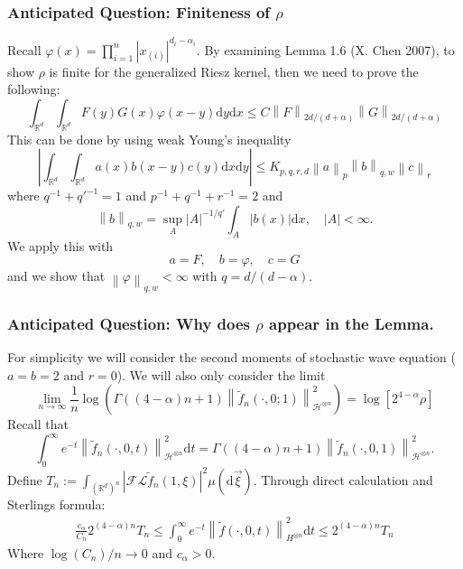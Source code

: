 \documentclass{beamer}%
\numberwithin{equation}{section}
\newcommand{\R}{\mathbb{R}}
\newcommand{\Norm}[1]{\left\|  #1   \right\|}
\newcommand{\ud}{\ensuremath{\mathrm{d} }}
\begin{document}
	\begin{frame}[t]
		\frametitle{Anticipated Question: Finiteness of $\rho$}
		Recall $\varphi(x) = \prod_{i=1}^n|x_{(i)}|^{d_i-\alpha_i}$. By examining Lemma 1.6 (X. Chen 2007), to show $\rho$ is finite for the generalized Riesz kernel, then we need to prove the following:
		\[\int_{\R^d}\int_{\R^d} F(y)G(x)\varphi(x-y) \ud y \ud x \le C \Norm{F}_{2d/(d+\alpha)} \Norm{G}_{2d/(d+ \alpha)}\]
		This can be done by using weak Young's inequality
		\[
		\left|	\int_{\R^d}\int_{\R^d}a(x)b(x-y)c(y) \ud x \ud y \right| \le K_{p,q,r,d} \Norm{a}_p\Norm{b}_{q,w}\Norm{c}_r
		\]
		where $q^{-1} + q'^{-1} = 1$ and $p^{-1}+q^{-1}+r^{-1} =2$ and
		\[
		\Norm{b}_{q,w} = \sup_{A} |A|^{-1/q'} \int_A |b(x)| \ud x, \quad |A| < \infty.
		\]
		We apply this with
		\[
		a=F, \quad b=\varphi, \quad c= G
		\]
		and we show that $\Norm{\varphi}_{q,w} < \infty$ with $q=d/(d-\alpha)$.
	\end{frame}
	
	
	\begin{frame}
		\frametitle{Anticipated Question: Why does $\rho$ appear in the Lemma.}
		
		For simplicity we will consider the second moments of stochastic wave equation ($a=b=2$ and $r=0$). We will also only consider the limit
		\[
		\lim_{n \to \infty}\frac{1}{n} \log\left(\Gamma((4-\alpha)n+1)\Norm{\tilde{f}_n(\cdot,0;1)}_{\mathcal{H}^{\otimes n}}^2\right) = \log\left[ 2^{4-\alpha}\rho \right]
		\]
		Recall that
		\[
		\int_0^\infty e^{-t}\Norm{\tilde{f}_n(\cdot,0,t)}_{\mathcal{H}^{\otimes n}}^2  \ud t = \Gamma((4-\alpha)n+1)\Norm{\tilde{f}_n(\cdot,0,1)}_{\mathcal{H}^{\otimes n}}^2.
		\]
		Define $T_n:= \int_{(\R^d)^n} \left| \mathcal{F}\mathcal{L}\tilde{f}_n(1,\xi)\right|^2 \mu (\ud \vec{\xi})$. Through direct calculation and Sterlings formula:
		\begin{align*}
		\frac{c_\alpha}{C_n} 2^{(4-\alpha)n}T_n \le \int_0^\infty e^{-t} \Norm{\tilde{f}(\cdot,0,t)}_{H^{\otimes n}}^2 \ud t  \le 2^{(4-\alpha)n}T_n
		\end{align*}
		Where $\log(C_n)/n \to 0$ and $c_\alpha >0$.
	\end{frame}
	
\end{document}
